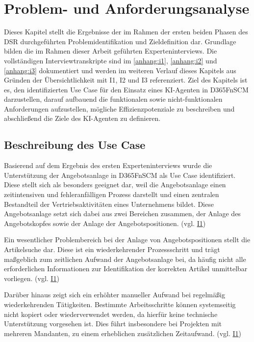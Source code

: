 \section{Problem- und Anforderungsanalyse}
Dieses Kapitel stellt die Ergebnisse der im Rahmen der ersten beiden Phasen des \ac{DSR} durchgeführten Problemidentifikation und Zieldefinition dar. Grundlage bilden die im Rahmen dieser Arbeit geführten Experteninterviews. Die vollständigen Interviewtranskripte sind im \ref{anhang:i1}, \ref{anhang:i2} und \ref{anhang:i3} dokumentiert und werden im weiteren Verlauf dieses Kapitels aus Gründen der Übersichtlichkeit mit I1, I2 und I3 referenziert. Ziel des Kapitels ist es, den identifizierten Use Case für den Einsatz eines \ac{KI}-Agenten in \ac{D365FnSCM} darzustellen, darauf aufbauend die funktionalen sowie nicht-funktionalen Anforderungen aufzustellen, mögliche Effizienzpotenziale zu beschreiben und abschließend die Ziele des \ac{KI}-Agenten zu definieren.

\subsection{Beschreibung des Use Case}
Basierend auf dem Ergebnis des ersten Experteninterviews wurde die Unterstützung der Angebotsanlage in \ac{D365FnSCM} als Use Case identifiziert. Diese stellt sich als besonders geeignet dar, weil die Angebotsanlage einen zeitintensiven und fehleranfälligen Prozess darstellt und einen zentralen Bestandteil der Vertriebsaktivitäten eines Unternehmens bildet. Diese Angebotsanlage setzt sich dabei aus zwei Bereichen zusammen, der Anlage des Angebotskopfes sowie der Anlage der Angebotspositionen. (vgl. \hyperref[anhang:i1]{I1})


Ein wesentlicher Problembereich bei der Anlage von Angebotspositionen stellt die Artikelsuche dar. Diese ist ein wiederkehrender Prozessschritt und trägt maßgeblich zum zeitlichen Aufwand der Angebotsanlage bei, da  häufig nicht alle erforderlichen Informationen zur Identifikation der korrekten Artikel unmittelbar vorliegen. (vgl. \hyperref[anhang:i1]{I1})

Darüber hinaus zeigt sich ein erhöhter manueller Aufwand bei regelmäßig wiederkehrenden Tätigkeiten. Bestimmte Arbeitsschritte können systemseitig nicht kopiert oder wiederverwendet werden, da hierfür keine technische Unterstützung vorgesehen ist. Dies führt insbesondere bei Projekten mit mehreren Mandanten, zu einem erheblichen zusätzlichen Zeitaufwand. (vgl. \hyperref[anhang:i1]{I1})

